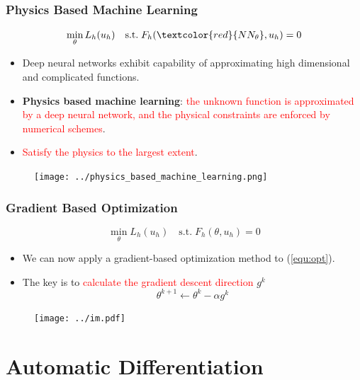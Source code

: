 \documentclass[usenames,dvipsnames]{beamer}
\begin{document}
\begin{frame}
	\frametitle{Physics Based Machine Learning}
	$$\min_{\theta} L_h(u_h) \quad \mathrm{s.t.}\;F_h(\textcolor{red}{NN_\theta}, u_h) = 0$$
	\vspace{-0.5cm}
	\begin{itemize}
		\item Deep neural networks exhibit capability of approximating high dimensional and complicated functions. 
		\item \textbf{Physics based machine learning}: \textcolor{red}{the unknown function is approximated by a deep neural network, and the physical constraints are enforced by numerical schemes}.
		\item \textcolor{red}{Satisfy the physics to the largest extent}.
	\end{itemize}
	\begin{figure}[hbt]
  \texttt{[image: ../physics\_based\_machine\_learning.png]}
\end{figure}
\end{frame}



\begin{frame}
	\frametitle{Gradient Based Optimization}
	\begin{equation}\label{equ:opt}
		\min_{\theta} L_h(u_h) \quad \mathrm{s.t.}\; F_h(\theta, u_h) = 0
		\end{equation}
	
	\begin{itemize}
		\item We can now apply a gradient-based optimization method to (\ref{equ:opt}).
		\item The key is to \textcolor{red}{calculate the gradient descent direction} $g^k$
		$$\theta^{k+1} \gets \theta^k - \alpha g^k$$ 
	\end{itemize}
	
	\begin{figure}[hbt]
	\centering
  \texttt{[image: ../im.pdf]}
\end{figure}

\end{frame}



\section{Automatic Differentiation}
\end{document}
